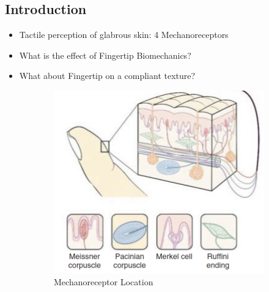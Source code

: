 \documentclass[
11pt,notheorems,hyperref={pdfauthor=whatever}
]{beamer}
\begin{document}
\subsection{Introduction}
\begin{frame}
    \begin{itemize}
        \item Tactile perception of glabrous skin: 4 Mechanoreceptors 
        \item What is the effect of Fingertip Biomechanics?
        \item What about Fingertip on a compliant texture?
    \end{itemize}
    \begin{figure}
        \centering
        \begin{subfigure}[b]{0.3\textwidth}
            \centering
            \includegraphics[scale=0.38]{Neuro_RecepLoca.jpg}
            \caption{Mechanoreceptor Location \cite{wixted2018stevens}}
        \end{subfigure}
        \begin{subfigure}[b]{0.3\textwidth}
            \centering

\end{subfigure}
\end{figure}
\end{frame}
\end{document}
